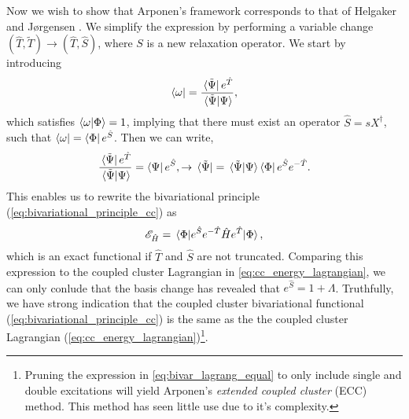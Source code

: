 Now we wish to show that Arponen's framework corresponds to that of
Helgaker and Jørgensen \cite{helgaker1988analytical}.
We simplify the expression by performing 
a variable change 
$(\hat{T}, \tilde{T}) \to (\hat{T}, \hat{S})$, where $S$ is a new relaxation operator.
We start by introducing 
\begin{equation}
    \bra{\omega} = \frac{\bra*{\tilde{\Psi}}e^{\hat{T}}}{\braket*{\tilde{\Psi}}{\Psi}},
\end{equation}
which satisfies $\braket{\omega}{\Phi} = 1$, implying that there must exist an operator
$\hat{S} = sX^\dagger$, such that $\bra{\omega} = \bra{\Phi}e^{\hat{S}}$. Then we 
can write,
\begin{equation}
    \begin{gathered}
        \frac{\bra*{\tilde{\Psi}}e^{\hat{T}}}{\braket*{\tilde{\Psi}}{\Psi}}
        = \bra{\Psi} e^{\hat{S}},
        \to \bra*{\tilde{\Psi}} 
        = \braket*{\tilde{\Psi}}{\Psi}\bra{\Phi}e^{\hat{S}}e^{-\hat{T}}.
    \end{gathered}
\end{equation}
This enables us to rewrite the bivariational principle (\autoref{eq:bivariational_principle_cc})
as
\begin{equation}
    \label{eq:bivar_lagrang_equal}
    \mathscr{E}_{\hat{H}} = \mel{\Phi}{e^{\hat{S}}e^{-\hat{T}}\hat{H}e^{\hat{T}}}{\Phi},
\end{equation} 
which is an exact functional if $\hat{T}$ and $\hat{S}$ are not truncated. Comparing this 
expression to the coupled cluster Lagrangian in \autoref{eq:cc_energy_lagrangian}, we can only
conlude that the basis change has revealed that
$e^{\hat{S}} = 1 + \Lambda$. Truthfully, we have strong indication that
the coupled cluster bivariational 
functional (\autoref{eq:bivariational_principle_cc}) is the same as the the 
coupled cluster Lagrangian (\autoref{eq:cc_energy_lagrangian})\footnote{Pruning 
the expression in \autoref{eq:bivar_lagrang_equal} to only include single and double 
excitations will yield Arponen's \emph{extended coupled cluster} (ECC) 
method\cite{arponen1987extended}.
This method has seen little use due to it's complexity.}.

